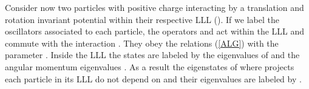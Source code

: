 \documentclass[a4paper,11pt]{article}
\begin{document}
Consider now two particles with positive charge \coordHE{} interacting
by a translation and rotation invariant potential \coordHE{} within 
their respective LLL (\coordHE{}).
If we label \coordHE{} the oscillators associated to each particle, the operators
\coordHE{} and \coordHE{}
act within the LLL and
commute with the interaction \coordHE{}.
They obey the relations (\ref{ALG}) with the parameter \coordHE{}.
Inside the LLL  the states \coordHE{} are labeled by
the eigenvalues of
\coordHE{}  \coordHE{}   and the angular momentum 
eigenvalues \coordHE{}. 
As a result the
eigenstates of \coordHE{} where \coordHE{} projects each particle in its
LLL do not depend on \coordHE{} and their eigenvalues
\coordHE{} are labeled by \coordHE{}. 
\end{document}
